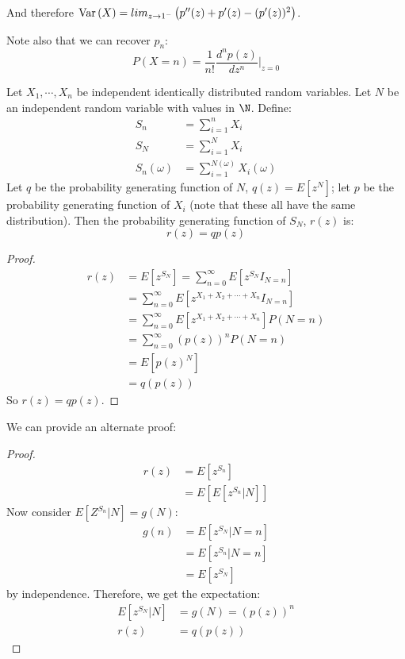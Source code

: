 \documentclass[../Main.tex]{subfiles}
\begin{document}
And therefore $\operatorname{Var}{(X)} = lim_{z \to 1^-} \left(p''(z) + p'(z) - (p'(z))^2\right)$.\par
Note also that we can recover $p_n$:
\begin{equation}
    P(X = n) = \frac{1}{n!} \frac{d^n p(z)}{dz^n} |_{z = 0}
    \label{eqnPGFProb}
\end{equation}
\begin{proposition}
    Let $X_1, \cdots, X_n$ be independent identically distributed random variables. Let $N$ be an independent random variable with values in $\N$. Define:
    \begin{align*}
        S_n &= \sum_{i=1}^n X_i \\
        S_N &= \sum_{i=1}^N X_i \\
        S_n(\omega) &= \sum_{i=1}^{N(\omega)} X_i(\omega)
    \end{align*}
    Let $q$ be the probability generating function of $N$, $q(z) = E[z^N]$; let $p$ be the probability generating function of $X_i$ (note that these all have the same distribution).
    Then the probability generating function of $S_N$, $r(z)$ is:
    \begin{equation*}
        r(z) = qp(z)
    \end{equation*}
\end{proposition}
\begin{proof}
    \begin{align*}
        r(z) &= E[z^{S_N}] = \sum_{n=0}^\infty E[z^{S_N} I_{N=n}] \\
        &= \sum_{n=0}^\infty E[z^{X_1 + X_2 + \cdots + X_n} I_{N=n}] \\
        &= \sum_{n=0}^\infty E[z^{X_1 + X_2 + \cdots + X_n}]P(N=n) \\
        &= \sum_{n=0}^\infty \left(p(z)\right)^n P(N=n) \\
        &= E[p(z)^N] \\
        &= q(p(z))
    \end{align*}
    So $r(z) = qp(z)$.
\end{proof}
We can provide an alternate proof:
\begin{proof}
    \begin{align*}
        r(z) &= E[z^{S_n}] \\
        &= E[E[z^{S_n} | N]]
    \end{align*}
    Now consider $E[Z^{S_n} | N] = g(N)$:
    \begin{align*}
        g(n) &= E[z^{S_N}|N=n] \\
        &= E[z^{S_n}|N=n] \\
        &= E[z^{S_N}]
    \end{align*}
    by independence. Therefore, we get the expectation:
    \begin{align*}
        E[z^{S_N} | N] &= g(N) = (p(z))^n \\
        r(z) &= q(p(z))
    \end{align*}
\end{proof}
\end{document}
